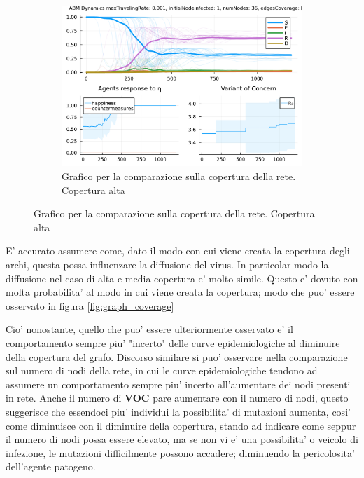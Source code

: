 \begin{figure}[!hb]
\begin{subfigure}[b]{0.3\textwidth}
		\includegraphics[width=\textwidth]{img/SocialNetworkABM_225.pdf}
		\caption{Grafico per la comparazione sulla copertura della rete. Copertura alta}
		\label{fig:comparison_lowCoverage}
	\end{subfigure}
\end{figure}

E' accurato assumere come, dato il modo con cui viene creata la copertura degli archi, questa 
possa influenzare la diffusione del virus. In particolar modo la diffusione nel caso di alta e media copertura 
e' molto simile. Questo e' dovuto con molta probabilita' al modo in cui viene creata la copertura; modo che 
puo' essere osservato in figura \ref{fig:graph_coverage}

Cio' nonostante, quello che puo' essere ulteriormente osservato e' il comportamento sempre piu' "incerto" delle curve 
epidemiologiche al diminuire della copertura del grafo. Discorso similare si puo' osservare nella comparazione sul numero 
di nodi della rete, in cui le curve epidemiologiche tendono ad assumere un comportamento sempre piu' incerto all'aumentare dei 
nodi presenti in rete. Anche il numero di \textbf{VOC} pare aumentare con il numero di nodi, questo suggerisce che essendoci 
piu' individui la possibilita' di mutazioni aumenta, cosi' come diminuisce con il diminuire della copertura, stando ad indicare 
come seppur il numero di nodi possa essere elevato, ma se non vi e' una possibilita' o veicolo di infezione, le mutazioni difficilmente
possono accadere; diminuendo la pericolosita' dell'agente patogeno.

